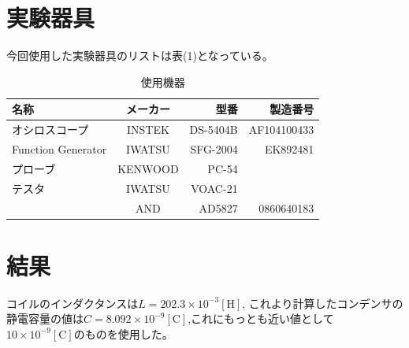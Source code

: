 \documentclass[a4j,10pt]{jarticle}
\begin{document}
\section{実験器具}
今回使用した実験器具のリストは表(1)となっている。
\begin{table}[hc]
\caption{使用機器}
\begin{tabular}{|l|c|r|r|}
\hline
名称 & メーカー & 型番 & 製造番号 \\ \hline \hline
オシロスコープ & INSTEK & DS-5404B & AF104100433 \\ \hline
Function Generator & IWATSU & SFG-2004 & EK892481 \\ \hline
プローブ&KENWOOD&PC-54&  \\ \hline
テスタ&IWATSU&VOAC-21& \\ \cline{2-4}
&AND&AD5827&0860640183 \\ \hline
\end{tabular}
\end{table}
\section{結果}
コイルのインダクタンスは$L=202.3\times10^{-3}[\mathrm H]$,
これより計算したコンデンサの静電容量の値は$C=8.092\times10^{-9}[\mathrm C]$,これにもっとも近い値として
$10\times10^{-9}[\mathrm C]$のものを使用した。
\end{document}
